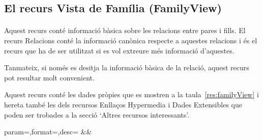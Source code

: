 \subsection{El recurs Vista de Família (FamilyView)}

    \paragraph{}
    Aquest recurs conté informació bàsica sobre les relacions entre pares i fills. El recurs Relacions conté la informació canònica respecte a aquestes relacions i és el recurs que ha de ser utilitzat si es vol extreure més informació d'aquestes.

    Tanmateix, si només es desitja la informació bàsica de la relació, aquest recurs pot resultar molt convenient.

    Aquest recurs conté les dades pròpies que es mostren a la taula~\ref{res:familyView} i hereta també les dels recursos Enllaços Hypermedia i Dades Extensibles que poden ser trobades a la secció `Altres recursos interessants'.

    \clearpage

    \begin{center}
             {param=\param,format=\format,desc=\desc}
             {\param&\format&\desc}
     \end{center}
